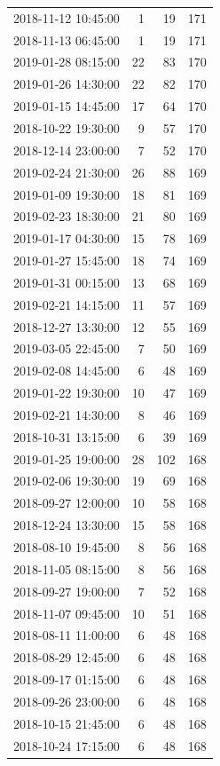 \begin{tabular}{lrrr}
2018-11-12 10:45:00 & 1 & 19 & 171 \\
2018-11-13 06:45:00 & 1 & 19 & 171 \\
2019-01-28 08:15:00 & 22 & 83 & 170 \\
2019-01-26 14:30:00 & 22 & 82 & 170 \\
2019-01-15 14:45:00 & 17 & 64 & 170 \\
2018-10-22 19:30:00 & 9 & 57 & 170 \\
2018-12-14 23:00:00 & 7 & 52 & 170 \\
2019-02-24 21:30:00 & 26 & 88 & 169 \\
2019-01-09 19:30:00 & 18 & 81 & 169 \\
2019-02-23 18:30:00 & 21 & 80 & 169 \\
2019-01-17 04:30:00 & 15 & 78 & 169 \\
2019-01-27 15:45:00 & 18 & 74 & 169 \\
2019-01-31 00:15:00 & 13 & 68 & 169 \\
2019-02-21 14:15:00 & 11 & 57 & 169 \\
2018-12-27 13:30:00 & 12 & 55 & 169 \\
2019-03-05 22:45:00 & 7 & 50 & 169 \\
2019-02-08 14:45:00 & 6 & 48 & 169 \\
2019-01-22 19:30:00 & 10 & 47 & 169 \\
2019-02-21 14:30:00 & 8 & 46 & 169 \\
2018-10-31 13:15:00 & 6 & 39 & 169 \\
2019-01-25 19:00:00 & 28 & 102 & 168 \\
2019-02-06 19:30:00 & 19 & 69 & 168 \\
2018-09-27 12:00:00 & 10 & 58 & 168 \\
2018-12-24 13:30:00 & 15 & 58 & 168 \\
2018-08-10 19:45:00 & 8 & 56 & 168 \\
2018-11-05 08:15:00 & 8 & 56 & 168 \\
2018-09-27 19:00:00 & 7 & 52 & 168 \\
2018-11-07 09:45:00 & 10 & 51 & 168 \\
2018-08-11 11:00:00 & 6 & 48 & 168 \\
2018-08-29 12:45:00 & 6 & 48 & 168 \\
2018-09-17 01:15:00 & 6 & 48 & 168 \\
2018-09-26 23:00:00 & 6 & 48 & 168 \\
2018-10-15 21:45:00 & 6 & 48 & 168 \\
2018-10-24 17:15:00 & 6 & 48 & 168 \\

\end{tabular}
